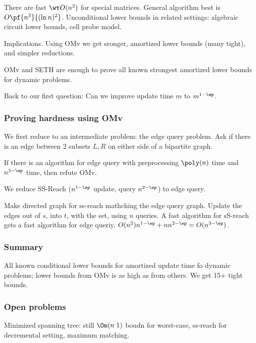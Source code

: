 There are fast $\wt O(n^2)$ for special matrices. General algorithm best is $O\pf{n^3}{(\ln n)^2}$.
Unconditional lower bounds in related settings: algebraic circuit lower bounds, cell probe model.

Implications.
Using OMv we get sronger, amortized lower bounds (many tight), and simpler reductions. 

OMv and SETH are enough to prove all known strongest amortized lower bounds for dynamic problems.

Back to our first question: Can we improve update time $m$ to $m^{1-\ep}$.

\subsubsection{Proving hardness using OMv}
We first reduce to an intermediate problem: the edge query problem. Ask if there is an edge between 2 subsets $L,R$ on either side of a bipartite graph.

\begin{thm}
If there is an algorithm for edge query with preprocessing $\poly(n)$ time and $n^{3-\ep}$ time, then refute OMv.
\end{thm}
We reduce SS-Reach ($n^{1-\ep}$ update, query $n^{2-\ep}$) to edge query.

Make directed graph for ss-reach mathching the edge query graph. Update the edges out of $s$, into $t$, with the set, using $n$ queries. A fast algorithm for sS-reach gets a fast algorithm for edge queriy. $O(n^2)n^{1-\ep}+nn^{2-\ep}=O(n^{3-\ep})$.

\subsubsection{Summary}

All known conditional lower bounds for amortized update time fo dynamic problems; lower bounds from OMv is as high as from others. We get 15$+$ tight bounds. 

\subsubsection{Open problems}

Minimized spanning tree: still $\Om(n^.1)$ boudn for worst-case, ss-reach for decremental setting, maximum matching.